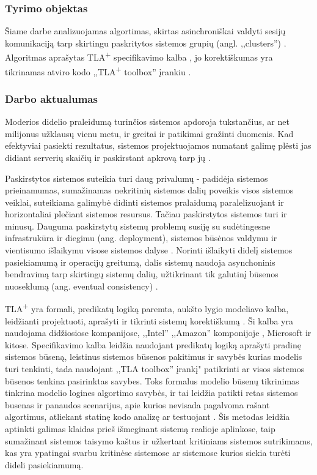 \subsubsection*{Tyrimo objektas}

  Šiame darbe analizuojamas algortimas, skirtas asinchroniškai valdyti sesijų komunikaciją tarp skirtingu paskritytos sistemos grupių (angl. ,,clusters'') \cite{petrauskas2018asynchronous, petrauskas2019effectiveness}.
  Algoritmas aprašytas TLA\textsuperscript{+} specifikavimo kalba \cite{lamporttla+}, jo korektiškumas yra tikrinamas atviro kodo ,,TLA\textsuperscript{+} toolbox'' įrankiu  \cite{kuppe2019tla+}.

\subsubsection*{Darbo aktualumas}
  
  Moderios didelio praleidumą turinčios sistemos apdoroja tukstančius, ar net milijonus užklausų vienu metu, ir greitai ir patikimai gražinti duomenis.
  Kad efektyviai pasiekti rezultatus, sistemos projektuojamos numatant galimę plėsti jas didiant serverių skaičių ir paskirstant apkrovą tarp jų \cite{soni2016nginx}.
  
  Paskirstytos sistemos suteikia turi daug privalumų - 
  padidėja sistemos prieinamumas, sumažinamas nekritinių sistemos dalių poveikis visos sistemos veiklai,
  suteikiama galimybė didinti sistemos pralaidumą paralelizuojant ir horizontaliai plečiant sistemos resursus. 
  Tačiau paskirstytos sistemos turi ir minusų. Dauguma paskirstytų sistemų problemų susiję su sudėtingesne infrastrukūra ir diegimu (ang. deployment), 
  sistemos būsėnos valdymu ir  vientisumo išlaikymu visose sistemos dalyse \cite{thones2015microservices}.
  Norinti išlaikyti didelį sistemos pasiekiamumą ir operacijų greitumą, dalis sistemų naudoja asynchoninis bendravimą tarp skirtingų sistemų dalių, 
  užtikrinant tik galutinį būsenos nuoseklumą (ang. eventual consistency) \cite{vogels2009eventually}.


  TLA\textsuperscript{+} yra formali, predikatų logiką paremta, aukšto lygio modeliavo kalba, leidžianti projektuoti, aprašyti ir tikrinti sistemų korektiškumą \cite{kuppe2019tla}.
  Ši kalba yra naudojama didžiosiose kompanijose, ,,Intel'' \cite{batson2002high} ,,Amazon'' komponijoje \cite{newcombe2015amazon}, Microsoft ir kitose. 
  Specifikavimo kalba leidžia naudojant predikatų logiką aprašyti pradinę sistemos būseną,
  leistinus sistemos būsenos pakitimus ir savybės kurias modelis turi tenkinti, 
  tada naudojant ,,TLA toolbox'' įrankį" patikrinti ar visos sistemos būsenos tenkina pasirinktas savybes.
  Toks formalus modelio būsenų tikrinimas tinkrina modelio logines algortimo savybės, ir tai leidžia patikti retas sistemos busenas ir panaudos scenarijus, 
  apie kurios nevisada pagalvoma rašant algortimus, atliekant statinę kodo analizę ar testuojant \cite{newcombe2015amazon}.
  Šis metodas leidžia aptinkti galimas klaidas prieš išmeginant sistemą realioje aplinkose,
  taip sumažinant sistemos taisymo kaštus ir užkertant kritiniams sistemos sutrikimams,
  kas yra ypatingai svarbu kritinėse sistemose ar sistemose kurios siekia turėti dideli pasiekiamumą.

